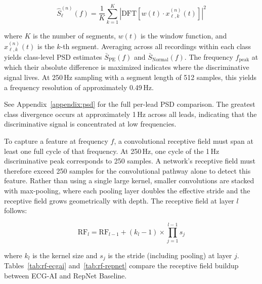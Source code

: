 \documentclass[sigconf,nonacm]{acmart}
\begin{document}
\begin{equation}
\hat{S}^{(n)}_\ell(f) = \frac{1}{K} \sum_{k=1}^{K} \left| \text{DFT}\left[ w(t) \cdot x^{(n)}_{\ell,k}(t) \right] \right|^2
\end{equation}

\noindent where $K$ is the number of segments, $w(t)$ is the window function, and $x^{(n)}_{\ell,k}(t)$ is the $k$-th segment. Averaging across all recordings within each class yields class-level PSD estimates $\bar{S}_{\text{PE}}(f)$ and $\bar{S}_{\text{Normal}}(f)$. The frequency $f_{\text{peak}}$ at which their absolute difference is maximized indicates where the discriminative signal lives. At 250\,Hz sampling with a segment length of 512 samples, this yields a frequency resolution of approximately 0.49\,Hz.

See Appendix~\ref{appendix:psd} for the full per-lead PSD comparison. The greatest class divergence occurs at approximately 1\,Hz across all leads, indicating that the discriminative signal is concentrated at low frequencies.

To capture a feature at frequency $f$, a convolutional receptive field must span at least one full cycle of that frequency. At 250\,Hz, one cycle of the 1\,Hz discriminative peak corresponds to 250 samples. A network's receptive field must therefore exceed 250 samples for the convolutional pathway alone to detect this feature. Rather than using a single large kernel, smaller convolutions are stacked with max-pooling, where each pooling layer doubles the effective stride and the receptive field grows geometrically with depth. The receptive field at layer $l$ follows:

\begin{equation}
\text{RF}_l = \text{RF}_{l-1} + (k_l - 1) \times \prod_{j=1}^{l-1} s_j
\end{equation}

\noindent where $k_l$ is the kernel size and $s_j$ is the stride (including pooling) at layer $j$. Tables~\ref{tab:rf-ecgai} and~\ref{tab:rf-repnet} compare the receptive field buildup between ECG-AI and RepNet Baseline.
\end{document}
